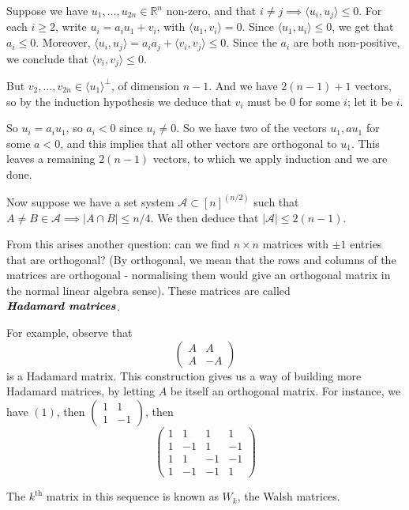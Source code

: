 \documentclass[]{article}
\theoremstyle{custhm}
\theoremstyle{cusdef}
\theoremstyle{custhm}
\theoremstyle{custhm}
\theoremstyle{custhm}
\theoremstyle{custhm}
\theoremstyle{cusdef}
\theoremstyle{remark}
\theoremstyle{custhm}
\newcommand{\R}{\mathbb{R}}
\newcommand{\undf}[1]{\textit{\textbf{#1}}}
\newcommand{\A}{\mathcal{A}}
\begin{document}
Suppose we have $u_1,\dots,u_{2n}\in \R^n$ non-zero, and that $i\ne j\implies \langle u_i,u_j\rangle \le 0$. For each $i\ge 2$, write $u_i = a_iu_1 + v_i$, with $\langle u_1,v_i\rangle = 0$. Since $\langle u_1,u_i\rangle \le 0$, we get that $a_i\le 0$. Moreover, $\langle u_i,u_j\rangle = a_ia_j + \langle v_i,v_j\rangle \le 0$. Since the $a_i$ are both non-positive, we conclude that $\langle v_i,v_j\rangle \le 0$.

But $v_2,\dots,v_{2n} \in \langle u_1\rangle^\perp$, of dimension $n-1$. And we have $2(n-1)+1$ vectors, so by the induction hypothesis we deduce that $v_i$ must be $0$ for some $i$; let it be $i$.

So $u_i = a_iu_1$, so $a_i < 0$ since $u_i\ne 0$. So we have two of the vectors $u_1,au_1$ for some $a < 0$, and this implies that all other vectors are orthogonal to $u_1$. This leaves a remaining $2(n-1)$ vectors, to which we apply induction and we are done.

Now suppose we have a set system $\A\subset [n]^{(n/2)}$ such that $A\ne B \in \A \implies |A\cap B| \le n/4$. We then deduce that $|\A| \le 2(n-1)$.

From this arises another question: can we find $n\times n$ matrices with $\pm 1$ entries that are orthogonal? (By orthogonal, we mean that the rows and columns of the matrices are orthogonal - normalising them would give an orthogonal matrix in the normal linear algebra sense). These matrices are called $\undf{Hadamard matrices}$.

For example, observe that $$\left(\begin{array}{cc} A & A \\ A & -A\end{array}\right)$$ is a Hadamard matrix. This construction gives us a way of building more Hadamard matrices, by letting $A$ be itself an orthogonal matrix. For instance, we have $(1)$, then $\left(\begin{array}{cc} 1 & 1 \\ 1 & -1\end{array}\right)$, then $$ \left(  \begin{array}{cccc} 1 & 1 & 1 & 1\\ 1 & -1 & 1 & -1\\ 1 & 1 & -1 & -1 \\ 1 & -1 & -1 & 1\end{array}\right)$$

The $k^{\textrm{th}}$ matrix in this sequence is known as $W_k$, the Walsh matrices.
\end{document}
